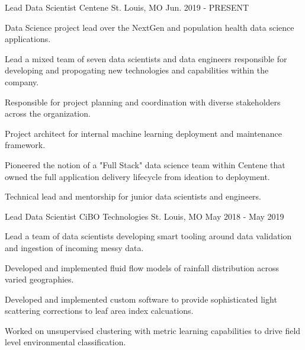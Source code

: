 

\begin{cventries}
  \cventry
    {Lead Data Scientist} %
    {Centene} %
    {St. Louis, MO} %
    {Jun. 2019 - PRESENT} %
    {
      \begin{cvitems} %
        \item {Data Science project lead over the NextGen and population health data science applications.}
        \item {Lead a mixed team of seven data scientists and data engineers responsible for developing and propogating new technologies and capabilities within the company.}
        \item {Responsible for project planning and coordination with diverse stakeholders across the organization.}
        \item {Project architect for internal machine learning deployment and maintenance framework.}
        \item {Pioneered the notion of a "Full Stack" data science team within Centene that owned the full application delivery lifecycle from ideation to deployment.}
        \item {Technical lead and mentorship for junior data scientists and engineers.}
      \end{cvitems}
    }

  \cventry
    {Lead Data Scientist} %
    {CiBO Technologies} %
    {St. Louis, MO} %
    {May 2018 - May 2019} %
    {
      \begin{cvitems} %
        \item {Lead a team of data scientists developing smart tooling around data validation and ingestion of incoming messy data.}
        \item {Developed and implemented fluid flow models of rainfall distribution across varied geographies.}
        \item {Developed and implemented custom software to provide sophisticated light scattering corrections to leaf area index calcuations.}
        \item {Worked on unsupervised clustering with metric learning capabilities to drive field level environmental classification.}
      \end{cvitems}
    }


\end{cventries}
